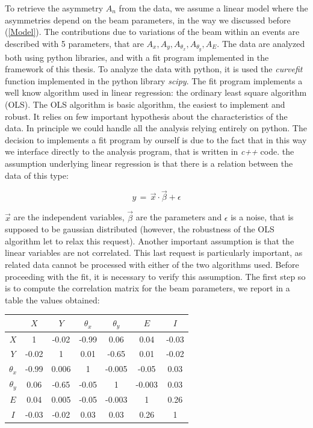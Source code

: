 To retrieve the asymmetry $A_{n}$ from the data, we assume a linear model where the asymmetries depend on the beam parameters, in the way we discussed before (\ref{Model}). The contributions due to variations of the beam within an events are described with 5 parameters, that are  $A_{x},A_{y},A_{\theta_{x}},A_{\theta_{y}},A_{E}$.
The data are analyzed both using python libraries, and with a fit program implemented in the framework of this thesis. To analyze the data with python, it is used the \textit{curvefit} function implemented in the python library \textit{scipy}.
The fit program implements a well know algorithm used in linear regression: the ordinary least square algorithm (OLS).
The OLS algorithm is basic algorithm, the easiest to implement and robust. It relies on few important hypothesis about the characteristics of the data. In principle we could handle all the analysis relying entirely on python. The decision to implements a fit program by ourself is due to the fact that in this way we interface directly to the analysis program, that is written in \textit{c++} code. 
the assumption underlying linear regression is that there is a relation between the data of this type:

\begin{equation}
 y \, = \, \vec{x} \cdot \vec{\beta} + \epsilon
\end{equation}

$\vec{x}$ are the independent variables, $\vec{\beta}$ are the parameters and $\epsilon$ is a noise, that is supposed to be gaussian distributed (however, the robustness of the OLS algorithm let to relax this request). Another important assumption is that the linear variables are not correlated. 
This last request is particularly important, as related data cannot be processed with either of the two algorithms used.
Before proceeding with the fit, it is necessary to verify this assumption. \medskip
The first step so is to compute the correlation matrix for the beam parameters, we report in a table the values obtained:

\begin{table}[hbtp]
\centering
\begin{tabular}{c|c|c|c|c|c|c}
\hline 
             & $X$ & $Y$ & $\theta_{x}$ & $\theta_{y}$ & $E$ & $I$\\ 
\hline 
$X$            & 1 & -0.02 & -0.99 & 0.06 & 0.04  & -0.03\\ 
\hline 
$Y$            & -0.02 & 1 & 0.01 & -0.65 & 0.01  & -0.02\\ 
\hline 
$\theta_{x}$ & -0.99 & 0.006 & 1  & -0.005 & -0.05 & 0.03\\ 
\hline 
$\theta_{y}$ & 0.06 & -0.65 & -0.05 & 1 & -0.003  & 0.03\\ 
\hline 
$E$            & 0.04 & 0.005 & -0.05  & -0.003  & 1 & 0.26\\ 
\hline 
$I$            & -0.03 & -0.02 & 0.03  & 0.03 & 0.26 & 1\\ 
\hline
\end{tabular} 
\end{table}


